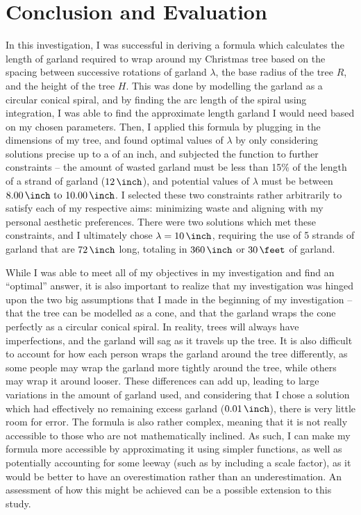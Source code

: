 \section{Conclusion and Evaluation}

In this investigation, I was successful in deriving a formula which calculates the length of garland required to wrap around my Christmas tree based on the spacing between successive rotations of garland $\lambda$, the base radius of the tree $R$, and the height of the tree $H$. This was done by modelling the garland as a circular conical spiral, and by finding the arc length of the spiral using integration, I was able to find the approximate length garland I would need based on my chosen parameters. Then, I applied this formula by plugging in the dimensions of my tree, and found optimal values of $\lambda$ by only considering solutions precise up to a  of an inch, and subjected the function to further constraints -- the amount of wasted garland must be less than 15\% of the length of a strand of garland ($\US{12}{\inch}$), and potential values of $\lambda$ must be between $\qtyrange{8.00}{10.00}{\inch}$. I selected these two constraints rather arbitrarily to satisfy each of my respective aims: minimizing waste and aligning with my personal aesthetic preferences. There were two solutions which met these constraints, and I ultimately chose $\lambda=\US{10}{\inch}$, requiring the use of 5 strands of garland that are $\US{72}{\inch}$ long, totaling in $\US{360}{\inch}$ or $\US{30}{\feet}$ of garland. 

While I was able to meet all of my objectives in my investigation and find an ``optimal'' answer, it is also important to realize that my investigation was hinged upon the two big assumptions that I made in the beginning of my investigation -- that the tree can be modelled as a cone, and that the garland wraps the cone perfectly as a circular conical spiral. In reality, trees will always have imperfections, and the garland will sag as it travels up the tree. It is also difficult to account for how each person wraps the garland around the tree differently, as some people may wrap the garland more tightly around the tree, while others may wrap it around looser. These differences can add up, leading to large variations in the amount of garland used, and considering that I chose a solution which had effectively no remaining excess garland ($\US{0.01}{\inch}$), there is very little room for error. The formula is also rather complex, meaning that it is not really accessible to those who are not mathematically inclined. As such, I can make my formula more accessible by approximating it using simpler functions, as well as potentially accounting for some leeway (such as by including a scale factor), as it would be better to have an overestimation rather than an underestimation. An assessment of how this might be achieved can be a possible extension to this study.
